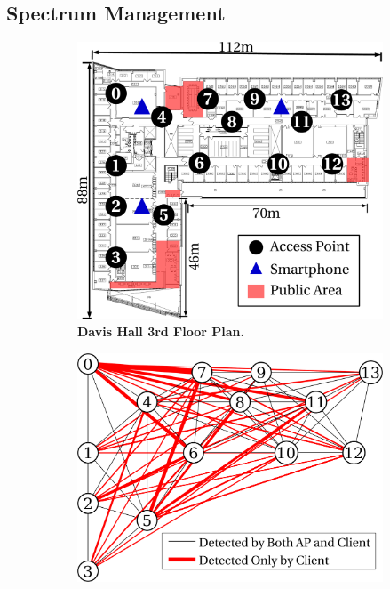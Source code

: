 \subsection{Spectrum Management}
\label{subsec:channel}

\begin{figure}[t]
  \begin{subfigure}[b]{0.33\textwidth}
    \includegraphics[width=\columnwidth]{./figures/davis_floor_plan.pdf}
    \caption{\textbf{Davis Hall 3rd Floor Plan.}}
    \label{fig:floor}
  \end{subfigure}%
  \begin{subfigure}[b]{0.33\textwidth}
    \includegraphics[width=\textwidth]{./figures/conflict_graph.pdf}

\end{subfigure}
\end{figure}
